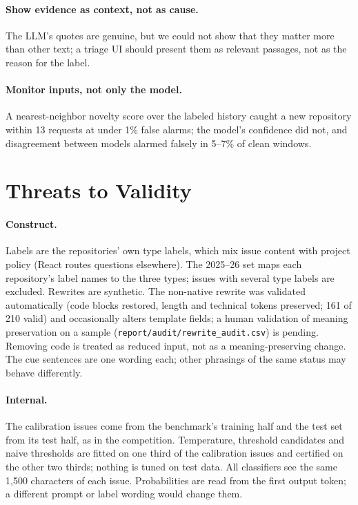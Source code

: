 \paragraph{Show evidence as context, not as cause.} The LLM's quotes are genuine, but we could not
show that they matter more than other text; a triage UI should present them as relevant passages,
not as the reason for the label.

\paragraph{Monitor inputs, not only the model.} A nearest-neighbor novelty score over the labeled
history caught a new repository within 13 requests at under 1\% false alarms; the model's confidence
did not, and disagreement between models alarmed falsely in 5--7\% of clean windows.

\section{Threats to Validity}\label{sec:threats}

\paragraph{Construct.} Labels are the repositories' own type labels, which mix issue content with
project policy (React routes questions elsewhere). The 2025--26 set maps each repository's label names
to the three types; issues with several type labels are excluded. Rewrites are synthetic. The
non-native rewrite was validated automatically (code blocks restored, length and technical tokens
preserved; 161 of 210 valid) and occasionally alters template fields; a human validation of
meaning preservation on a sample (\texttt{report/audit/rewrite\_audit.csv}) is pending. Removing code
is treated as reduced input, not as a meaning-preserving change. The cue sentences are one wording
each; other phrasings of the same status may behave differently.

\paragraph{Internal.} The calibration issues come from the benchmark's training half and the test set
from its test half, as in the competition. Temperature, threshold candidates and naive thresholds are
fitted on one third of the calibration issues and certified on the other two thirds; nothing is tuned
on test data. All classifiers see the same 1{,}500 characters of each issue. Probabilities are read
from the first output token; a different prompt or label wording would change them.

